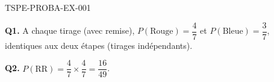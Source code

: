 \begin{corrige}{TSPE-PROBA-EX-001}

\textbf{Q1.} A chaque tirage (avec remise), $P(\text{Rouge})=\dfrac{4}{7}$ et $P(\text{Bleue})=\dfrac{3}{7}$, identiques aux deux étapes (tirages indépendants).

\textbf{Q2.} $P(\text{RR}) = \dfrac{4}{7}\times\dfrac{4}{7} = \boxed{\dfrac{16}{49}}$.

\end{corrige}
